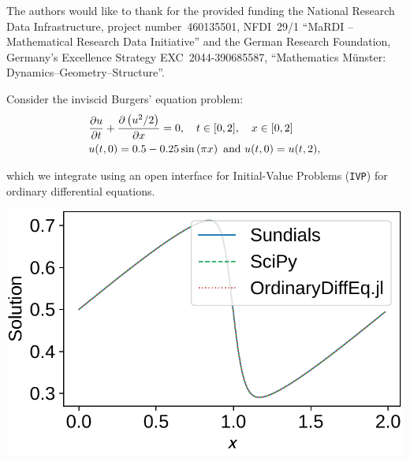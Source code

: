 \documentclass[a0paper, twocolumn, csc, english, final]{mpi2015_poster}
\begin{document}
\begin{poster}
\begin{pcolumn}
    \begin{pbox}
      \large
      The authors would like to thank for the provided funding
      the National Research Data Infrastructure,
      project number~460135501, NFDI~29/1 “MaRDI – Mathematical
      Research Data Initiative”
      and
      the German Research Foundation,
      Germany's Excellence Strategy EXC~2044-390685587,
      ``Mathematics Münster: Dynamics--Geometry--Structure''.
    \end{pbox}
  \end{pcolumn}
  \begin{pcolumn}
    \begin{pbox}
      \large
      Consider the inviscid Burgers' equation problem:
      \begin{align*}
         & \pdv{u}{t} + \pdv{\left( u^{2} / 2 \right)}{x} = 0,
        \quad t \in [0, 2], \quad x \in [0, 2]                         \\
         & u(t, 0) = 0.5 - 0.25 \sin \left( \pi x \right) \mbox{ and }
        u(t, 0) = u(t, 2),
      \end{align*}
      \begin{minipage}{\dimexpr0.58\columnwidth - 2\tabcolsep}
        which we integrate
        using an open interface
        for Initial-Value Problems (\texttt{IVP}) for ordinary differential
        equations.

      \end{minipage}\hfill%
      \begin{minipage}{\dimexpr0.42\columnwidth - 2\tabcolsep}
        \vspace{0.5em}
        \centerline{\includegraphics[scale=1]{ivp_c_burgers_eq}}
      \end{minipage}


\end{pbox}
\end{pcolumn}
\end{poster}
\end{document}
